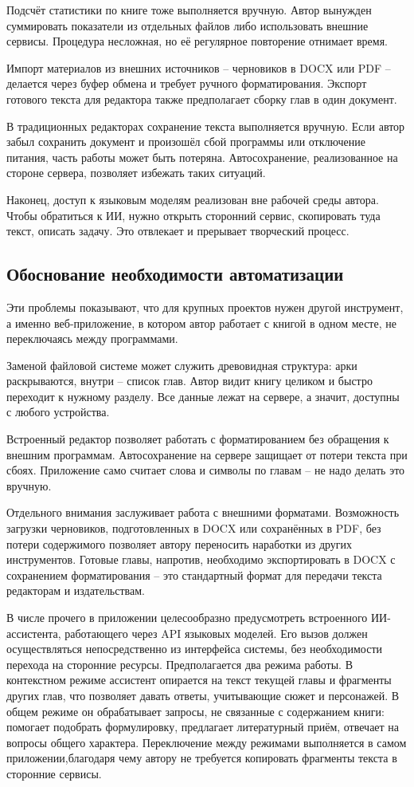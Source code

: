 Подсчёт статистики по книге тоже выполняется вручную. Автор вынужден суммировать показатели из отдельных файлов либо использовать внешние сервисы. Процедура несложная, но её регулярное повторение отнимает время.

Импорт материалов из внешних источников -- черновиков в DOCX или PDF -- делается через буфер обмена и требует ручного форматирования. Экспорт готового текста для редактора также предполагает сборку глав в один документ.

В традиционных редакторах сохранение текста выполняется вручную. Если автор забыл сохранить документ и произошёл сбой программы или отключение питания, часть работы может быть потеряна. Автосохранение, реализованное на стороне сервера, позволяет избежать таких ситуаций.

Наконец, доступ к языковым моделям реализован вне рабочей среды автора. Чтобы обратиться к ИИ, нужно открыть сторонний сервис, скопировать туда текст, описать задачу. Это отвлекает и прерывает творческий процесс.

\subsection{Обоснование необходимости автоматизации}

Эти проблемы показывают, что для крупных проектов нужен другой инструмент, а именно веб-приложение, в котором автор работает с книгой в одном месте, не переключаясь между программами.

Заменой файловой системе может служить древовидная структура: арки раскрываются, внутри -- список глав. Автор видит книгу целиком и быстро переходит к нужному разделу. Все данные лежат на сервере, а значит, доступны с любого устройства.

Встроенный редактор позволяет работать с форматированием без обращения к внешним программам. Автосохранение на сервере защищает от потери текста при сбоях. Приложение само считает слова и символы по главам -- не надо делать это вручную.

Отдельного внимания заслуживает работа с внешними форматами. Возможность загрузки черновиков, подготовленных в DOCX или сохранённых в PDF, без потери содержимого позволяет автору переносить наработки из других инструментов. Готовые главы, напротив, необходимо экспортировать в DOCX с сохранением форматирования -- это стандартный формат для передачи текста редакторам и издательствам.

В числе прочего в приложении целесообразно предусмотреть встроенного ИИ-ассистента, работающего через API языковых моделей. Его вызов должен осуществляться непосредственно из интерфейса системы, без необходимости перехода на сторонние ресурсы. Предполагается два режима работы. В контекстном режиме ассистент опирается на текст текущей главы и фрагменты других глав, что позволяет давать ответы, учитывающие сюжет и персонажей. В общем режиме он обрабатывает запросы, не связанные с содержанием книги: помогает подобрать формулировку, предлагает литературный приём, отвечает на вопросы общего характера. Переключение между режимами выполняется в самом приложении,благодаря чему автору не требуется копировать фрагменты текста в сторонние сервисы.

